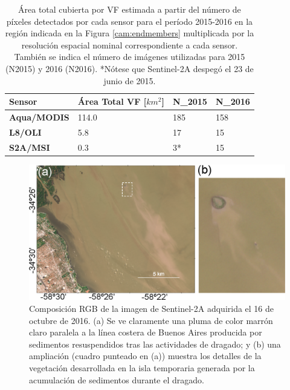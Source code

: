         
        \begin{table}
        \caption[Área total cubierta por VF estimada a partir del número de píxeles detectados por cada sensor y su resolución espacial para el período 2015-2016 en la región indicada en la Figura \ref{cam:endmembers}.]{Área total cubierta por VF estimada a partir del número de píxeles detectados por cada sensor para el período 2015-2016 en la región indicada en la Figura \ref{cam:endmembers} multiplicada por la resolución espacial nominal correspondiente a cada sensor. También se indica el número de imágenes utilizadas para 2015 (N2015) y 2016 (N2016). *Nótese que Sentinel-2A despegó el 23 de junio de 2015.}
        \begin{tabular}{|l|l|l|l|}
        \hline
        \textbf{Sensor}     & \textbf{Área Total VF [$km^{2}$]} & \textbf{N\_{2015}} & \textbf{N\_{2016}} \\ \hline
        \textbf{Aqua/MODIS} & 114.0                             & 185                & 158                \\ \hline
        \textbf{L8/OLI}     & 5.8                               & 17                 & 15                 \\ \hline
        \textbf{S2A/MSI}    & 0.3                               & 3*                 & 15                 \\ \hline
        \end{tabular}
        \label{cam:tab:area}
        \end{table}

        \begin{figure}
        \centering
        \includegraphics[width=\textwidth]{cam/figures/monticulo.png}
        \caption[Composición RGB de la imagen de Sentinel-2A del 16-OCT-2016 mostrando una pluma turbia y una isla temporaria producidas por sedimentos resuspendidos tras las actividades de dragado.]{Composición RGB de la imagen de Sentinel-2A adquirida el 16 de octubre de 2016. (a) Se ve claramente una pluma de color marrón claro paralela a la línea costera de Buenos Aires producida por sedimentos resuspendidos tras las actividades de dragado; y (b) una ampliación (cuadro punteado en (a)) muestra los detalles de la vegetación desarrollada en la isla temporaria generada por la acumulación de sedimentos durante el dragado.}
        \label{cam:monticulo}
        \end{figure}

